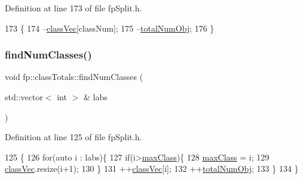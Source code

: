 Definition at line 173 of file fp\+Split.\+h.


\begin{DoxyCode}
173                                                     \{
174                 --\hyperlink{classfp_1_1classTotals_af96102537592dbda8601d0235dfccfca}{classVec}[classNum];
175                 --\hyperlink{classfp_1_1classTotals_a97be63e3e4a1b7c553df839034828aae}{totalNumObj};
176             \}
\end{DoxyCode}
\mbox{\label{classfp_1_1classTotals_a4d042d3a31d3f03d577bd4ad02bb5e6a}} 
\subsubsection{\texorpdfstring{find\+Num\+Classes()}{findNumClasses()}}
{\footnotesize\ttfamily void fp\+::class\+Totals\+::find\+Num\+Classes (\begin{DoxyParamCaption}\item[{std\+::vector$<$ int $>$ \&}]{labs }\end{DoxyParamCaption})\hspace{0.3cm}{\ttfamily [inline]}}



Definition at line 125 of file fp\+Split.\+h.


\begin{DoxyCode}
125                                                      \{
126                 \textcolor{keywordflow}{for}(\textcolor{keyword}{auto} i : labs)\{
127                     \textcolor{keywordflow}{if}(i>\hyperlink{classfp_1_1classTotals_a83aa8e17bf3b31db3ae19b9ab554624b}{maxClass})\{
128                         \hyperlink{classfp_1_1classTotals_a83aa8e17bf3b31db3ae19b9ab554624b}{maxClass} = i;
129                         \hyperlink{classfp_1_1classTotals_af96102537592dbda8601d0235dfccfca}{classVec}.resize(i+1);
130                     \}
131                     ++\hyperlink{classfp_1_1classTotals_af96102537592dbda8601d0235dfccfca}{classVec}[i];
132                     ++\hyperlink{classfp_1_1classTotals_a97be63e3e4a1b7c553df839034828aae}{totalNumObj};
133                 \}
134             \}
\end{DoxyCode}
\mbox{\label{classfp_1_1classTotals_aa05c13b36638adc361d638559c43a447}} 
